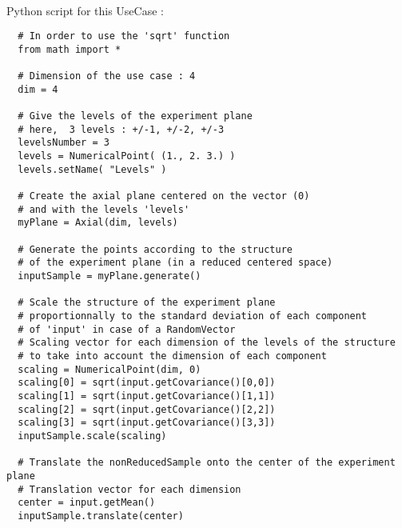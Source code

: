\textspace\\
Python script for this UseCase :

\begin{lstlisting}
  # In order to use the 'sqrt' function
  from math import *

  # Dimension of the use case : 4
  dim = 4

  # Give the levels of the experiment plane
  # here,  3 levels : +/-1, +/-2, +/-3
  levelsNumber = 3
  levels = NumericalPoint( (1., 2. 3.) )
  levels.setName( "Levels" )

  # Create the axial plane centered on the vector (0)
  # and with the levels 'levels'
  myPlane = Axial(dim, levels)

  # Generate the points according to the structure
  # of the experiment plane (in a reduced centered space)
  inputSample = myPlane.generate()

  # Scale the structure of the experiment plane
  # proportionnally to the standard deviation of each component
  # of 'input' in case of a RandomVector
  # Scaling vector for each dimension of the levels of the structure
  # to take into account the dimension of each component
  scaling = NumericalPoint(dim, 0)
  scaling[0] = sqrt(input.getCovariance()[0,0])
  scaling[1] = sqrt(input.getCovariance()[1,1])
  scaling[2] = sqrt(input.getCovariance()[2,2])
  scaling[3] = sqrt(input.getCovariance()[3,3])
  inputSample.scale(scaling)

  # Translate the nonReducedSample onto the center of the experiment plane
  # Translation vector for each dimension
  center = input.getMean()
  inputSample.translate(center)
\end{lstlisting}



